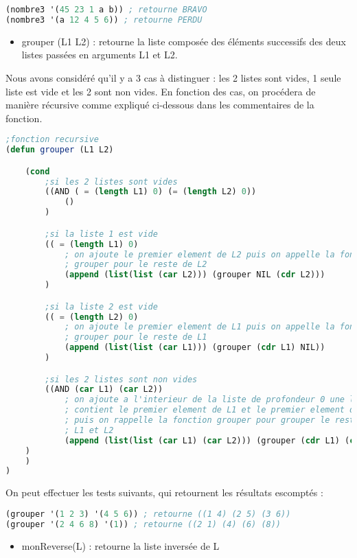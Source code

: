 \documentclass[a4paper, 12pt]{article}
\begin{document}
\begin{lstlisting}[language=Lisp]
(nombre3 '(45 23 1 a b)) ; retourne BRAVO
(nombre3 '(a 12 4 5 6)) ; retourne PERDU
\end{lstlisting}
\vspace{5mm}


\begin{itemize}[label=\textbullet]
    \item grouper (L1 L2) : retourne la liste composée des éléments successifs des deux listes passées en arguments L1 et L2.
\end{itemize}
\vspace{3mm}
Nous avons considéré qu’il y a 3 cas à distinguer : les 2 listes sont vides, 1 seule liste est vide et les 2 sont non vides. En fonction des cas, on procédera de manière récursive comme expliqué ci-dessous dans les commentaires de la fonction.
\vspace{2mm}

\begin{lstlisting}[language=Lisp]
    ;fonction recursive
(defun grouper (L1 L2)

    (cond
        ;si les 2 listes sont vides
        ((AND ( = (length L1) 0) (= (length L2) 0))
            ()
        )

        ;si la liste 1 est vide
        (( = (length L1) 0)
            ; on ajoute le premier element de L2 puis on appelle la fonction
            ; grouper pour le reste de L2
            (append (list(list (car L2))) (grouper NIL (cdr L2)))
        )

        ;si la liste 2 est vide
        (( = (length L2) 0)
            ; on ajoute le premier element de L1 puis on appelle la fonction
            ; grouper pour le reste de L1
            (append (list(list (car L1))) (grouper (cdr L1) NIL))
        )

        ;si les 2 listes sont non vides
        ((AND (car L1) (car L2))
            ; on ajoute a l'interieur de la liste de profondeur 0 une liste qui
            ; contient le premier element de L1 et le premier element de L2
            ; puis on rappelle la fonction grouper pour grouper le reste des listes
            ; L1 et L2
            (append (list(list (car L1) (car L2))) (grouper (cdr L1) (cdr L2)))
    )
    )
)
\end{lstlisting}
\vspace{2mm}
On peut effectuer les tests suivants, qui retournent les résultats escomptés :
\vspace{2mm}
\begin{lstlisting}[language=Lisp]
(grouper '(1 2 3) '(4 5 6)) ; retourne ((1 4) (2 5) (3 6))
(grouper '(2 4 6 8) '(1)) ; retourne ((2 1) (4) (6) (8))
\end{lstlisting}
\vspace{5mm}
\begin{itemize}[label=\textbullet]
    \item monReverse(L) : retourne la liste inversée de L
\end{itemize}
\vspace{3mm}
\end{document}
